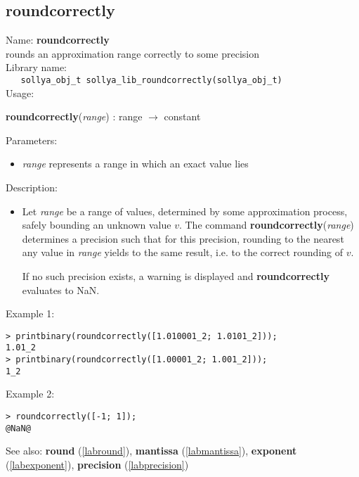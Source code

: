 \subsection{roundcorrectly}
\label{labroundcorrectly}
\noindent Name: \textbf{roundcorrectly}\\
\phantom{aaa}rounds an approximation range correctly to some precision\\[0.2cm]
\noindent Library name:\\
\verb|   sollya_obj_t sollya_lib_roundcorrectly(sollya_obj_t)|\\[0.2cm]
\noindent Usage: 
\begin{center}
\textbf{roundcorrectly}(\emph{range}) : \textsf{range} $\rightarrow$ \textsf{constant}\\
\end{center}
Parameters: 
\begin{itemize}
\item \emph{range} represents a range in which an exact value lies
\end{itemize}
\noindent Description: \begin{itemize}

\item Let \emph{range} be a range of values, determined by some approximation
   process, safely bounding an unknown value $v$. The command
   \textbf{roundcorrectly}(\emph{range}) determines a precision such that for this precision,
   rounding to the nearest any value in \emph{range} yields to the same
   result, i.e. to the correct rounding of $v$.
    
   If no such precision exists, a warning is displayed and \textbf{roundcorrectly}
   evaluates to NaN.
\end{itemize}
\noindent Example 1: 
\begin{center}\begin{minipage}{15cm}\begin{Verbatim}[frame=single]
> printbinary(roundcorrectly([1.010001_2; 1.0101_2]));
1.01_2
> printbinary(roundcorrectly([1.00001_2; 1.001_2]));
1_2
\end{Verbatim}
\end{minipage}\end{center}
\noindent Example 2: 
\begin{center}\begin{minipage}{15cm}\begin{Verbatim}[frame=single]
> roundcorrectly([-1; 1]);
@NaN@
\end{Verbatim}
\end{minipage}\end{center}
See also: \textbf{round} (\ref{labround}), \textbf{mantissa} (\ref{labmantissa}), \textbf{exponent} (\ref{labexponent}), \textbf{precision} (\ref{labprecision})
